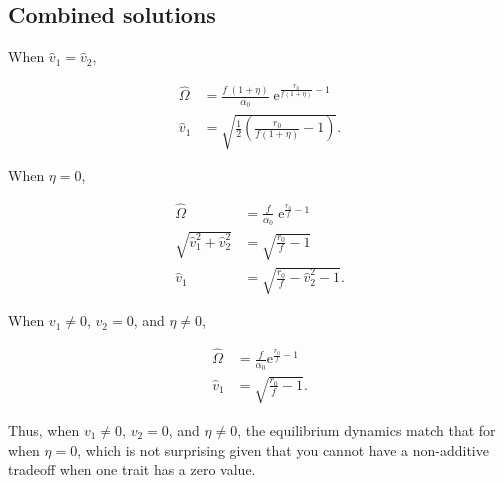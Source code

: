 \subsection*{Combined solutions}

When $\hat{v}_1 = \hat{v}_2$,

\begin{equation}  \label{eq:two-traits-finals1}
\begin{split}
    \hat{\Omega} &= \frac{ f \; ( 1 + \eta ) }{ \alpha_0 } \;
        \textrm{e}^{\frac{  r_0 }{ f ( 1 + \eta ) } - 1 }
        \\
    \hat{v}_1 &= \sqrt{
        \frac{1}{2} \left( \frac{ r_0 }{ f (1 + \eta) } - 1 \right)
    }
    \textrm{.}
\end{split}
\end{equation}


\noindent When $\eta = 0$,

\begin{equation}  \label{eq:two-traits-finals2}
\begin{split}
    \hat{\Omega} &= \frac{ f }{ \alpha_0 } \; \textrm{e}^{\frac{ r_0 }{ f } - 1 } \\
    \sqrt{\hat{v}_1^2 + \hat{v}_2^2} &= \sqrt{ \frac{ r_0 }{ f } - 1 } \\
    \hat{v}_1 &= \sqrt{ \frac{ r_0  }{ f } - \hat{v}_2^2 - 1 }
    \textrm{.}
\end{split}
\end{equation}


\noindent When $v_1 \ne 0$, $v_2 = 0$, and $\eta \ne 0$,

\begin{equation}  \label{eq:two-traits-finals3}
\begin{split}
    \hat{\Omega} &= \frac{f}{\alpha_0} \textrm{e}^{\frac{r_0}{f} - 1} \\
    \hat{v}_1 &= \sqrt{ \frac{ r_0 }{ f } - 1 }
    \textrm{.}
\end{split}
\end{equation}

\noindent Thus, when $v_1 \ne 0$, $v_2 = 0$, and $\eta \ne 0$, the equilibrium
dynamics match that for when $\eta = 0$, which is not surprising given that
you cannot have a non-additive tradeoff when one trait has a zero value.

















